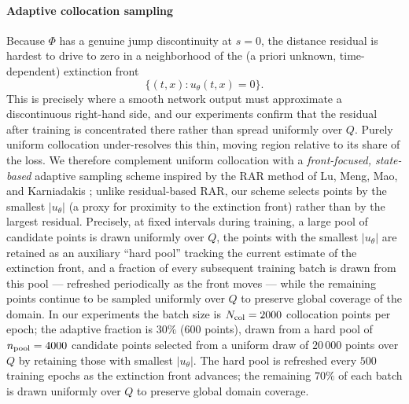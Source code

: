 \documentclass[11pt]{elsarticle}
\theoremstyle{definition}
\theoremstyle{remark}
\numberwithin{equation}{section}
\begin{document}
\paragraph{Adaptive collocation sampling}
Because $\Phi$ has a genuine jump discontinuity at $s=0$, the distance
residual is hardest to drive to zero in a neighborhood of the (a priori
unknown, time-dependent) extinction front $$\{(t,x):u_\theta(t,x)=0\}.$$ This
is precisely where a smooth network output must approximate a discontinuous
right-hand side, and our experiments confirm that the residual after
training is concentrated there rather than spread uniformly over $Q$.
Purely uniform collocation under-resolves this thin, moving region relative
to its share of the loss. We therefore complement uniform collocation with
a \emph{front-focused, state-based} adaptive sampling scheme inspired by
the RAR method of Lu, Meng, Mao, and Karniadakis
\cite{LuMengMaoKarniadakis2021DeepXDE}; unlike residual-based RAR, our
scheme selects points by the smallest $|u_\theta|$ (a proxy for proximity
to the extinction front) rather than by the largest residual. Precisely, at fixed intervals during training,
a large pool of candidate points is drawn uniformly over $Q$, the points
with the smallest $|u_\theta|$ are retained as an auxiliary ``hard pool''
tracking the current estimate of the extinction front, and a fraction of
every subsequent training batch is drawn from this pool — refreshed
periodically as the front moves — while the remaining points continue to be
sampled uniformly over $Q$ to preserve global coverage of the domain.
In our experiments the batch size is $N_{\rm col}=2000$ collocation points per
epoch; the adaptive fraction is $30\%$ (600 points), drawn from a hard pool
of $n_{\rm pool}=4000$ candidate points selected from a uniform draw of
$20\,000$ points over $Q$ by retaining those with smallest $|u_\theta|$.
The hard pool is refreshed every $500$ training epochs as the extinction
front advances; the remaining $70\%$ of each batch is drawn uniformly over
$Q$ to preserve global domain coverage.
\end{document}
